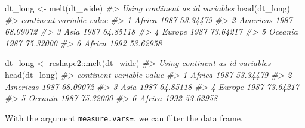 \documentclass[
]{book}
\newenvironment{Shaded}{\begin{snugshade}}{\end{snugshade}}
\newcommand{\CommentTok}[1]{\textcolor[rgb]{0.56,0.35,0.01}{\textit{#1}}}
\newcommand{\FunctionTok}[1]{\textcolor[rgb]{0.00,0.00,0.00}{#1}}
\newcommand{\NormalTok}[1]{#1}
\newcommand{\OtherTok}[1]{\textcolor[rgb]{0.56,0.35,0.01}{#1}}
\newcommand{\SpecialCharTok}[1]{\textcolor[rgb]{0.00,0.00,0.00}{#1}}
\begin{document}
\begin{Shaded}
\begin{Highlighting}[]
\NormalTok{dt\_long }\OtherTok{\textless{}{-}} \FunctionTok{melt}\NormalTok{(dt\_wide)}
\CommentTok{\#\textgreater{} Using continent as id variables}
\FunctionTok{head}\NormalTok{(dt\_long)}
\CommentTok{\#\textgreater{}   continent variable    value}
\CommentTok{\#\textgreater{} 1    Africa     1987 53.34479}
\CommentTok{\#\textgreater{} 2  Americas     1987 68.09072}
\CommentTok{\#\textgreater{} 3      Asia     1987 64.85118}
\CommentTok{\#\textgreater{} 4    Europe     1987 73.64217}
\CommentTok{\#\textgreater{} 5   Oceania     1987 75.32000}
\CommentTok{\#\textgreater{} 6    Africa     1992 53.62958}

\NormalTok{dt\_long }\OtherTok{\textless{}{-}}\NormalTok{ reshape2}\SpecialCharTok{::}\FunctionTok{melt}\NormalTok{(dt\_wide)}
\CommentTok{\#\textgreater{} Using continent as id variables}
\FunctionTok{head}\NormalTok{(dt\_long)}
\CommentTok{\#\textgreater{}   continent variable    value}
\CommentTok{\#\textgreater{} 1    Africa     1987 53.34479}
\CommentTok{\#\textgreater{} 2  Americas     1987 68.09072}
\CommentTok{\#\textgreater{} 3      Asia     1987 64.85118}
\CommentTok{\#\textgreater{} 4    Europe     1987 73.64217}
\CommentTok{\#\textgreater{} 5   Oceania     1987 75.32000}
\CommentTok{\#\textgreater{} 6    Africa     1992 53.62958}
\end{Highlighting}
\end{Shaded}

With the argument \texttt{measure.vars=}, we can filter the data frame.
\end{document}
